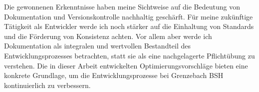 \documentclass[12pt,oneside]{article}
\begin{document}
    \newline
    Die gewonnenen Erkenntnisse haben meine Sichtweise auf die Bedeutung von Dokumentation und Versionskontrolle nachhaltig geschärft. Für meine zukünftige Tätigkeit als Entwickler werde ich noch stärker auf die Einhaltung von Standards und die Förderung von Konsistenz achten. Vor allem aber werde ich Dokumentation als integralen und wertvollen Bestandteil des Entwicklungsprozesses betrachten, statt sie als eine nachgelagerte Pflichtübung zu verstehen. Die in dieser Arbeit entwickelten Optimierungsvorschläge bieten eine konkrete Grundlage, um die Entwicklungsprozesse bei Grenzebach BSH kontinuierlich zu verbessern.


    \clearpage
    

    \clearpage
    \def\UrlBreaks{\do\/\do-} %
    
    


    
\end{document}
